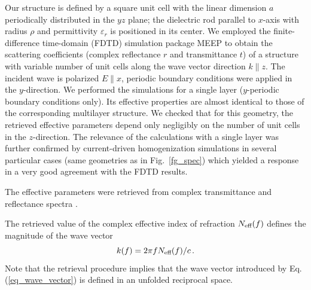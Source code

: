 Our structure  is defined by a square unit cell with the linear dimension $a$ periodically distributed in the $yz$ plane; the dielectric rod parallel to $x$-axis with radius $\rho$ and permittivity $\varepsilon_r$ is positioned in its center. We employed the finite-difference time-domain (FDTD) simulation package MEEP \cite{oskooi2010meep} to obtain the scattering coefficients (complex reflectance $r$ and transmittance $t$) of a structure with variable number of unit cells along the wave vector direction $k\parallel z$. The incident wave is polarized $E\parallel x$, periodic boundary conditions were applied in the $y$-direction. We performed the simulations for a single layer ($y$-periodic boundary conditions only). Its effective properties are almost identical to those of the corresponding multilayer structure. We checked that for this geometry, the retrieved effective parameters depend only negligibly on the number of unit cells in the $z$-direction. The relevance of the calculations with a single layer was further confirmed by current-driven homogenization simulations \cite{markel2013current} in several particular cases (same geometries as in Fig.~\ref{fg_spec}) which yielded a response in a very good agreement with the FDTD results.

The effective parameters were  retrieved from complex transmittance and reflectance spectra \cite{smith2002determination}.   

The retrieved value of the complex effective index of refraction $N_{\text{eff} }(f)$ defines the magnitude of the wave vector
\begin{equation}\label{eq_wave_vector} k(f) = 2\pi f N_{\text{eff} }(f) /c\,.  \end{equation}
Note that the retrieval procedure  implies that the wave vector introduced by Eq. (\ref{eq_wave_vector}) is defined in an unfolded reciprocal space. 

